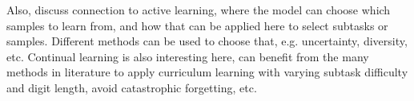Also, discuss connection to active learning, where the model can choose which samples to learn from, and how that can be applied here to select subtasks or samples. Different methods can be used to choose that, e.g. uncertainty, diversity, etc. Continual learning is also interesting here, can benefit from the many methods in literature to apply curriculum learning with varying subtask difficulty and digit length, avoid catastrophic forgetting, etc. 